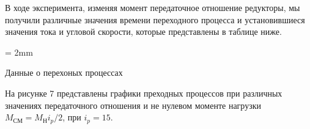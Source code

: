 \documentclass[a4paper, 12pt]{article}
\begin{document}
В ходе эксперимента, изменяя момент передаточное отношение редукторы, мы получили различные значения времени переходного процесса и установившиеся значения тока и угловой скорости, которые представлены в таблице ниже.
\newpage
\begin{table}[h]
	\tabulinesep = 2mm
	\centering
    \begin{threeparttable}
        \caption{Данные о перехоных процессах }
    \end{threeparttable}
\end{table}
\newpage
На рисунке 7 представлены графики преходных процессов при различных значениях передаточного отношения и не нулевом моменте нагрузки $M_\text{СМ} = M_\text{Н}i_p/2$, при $i_p = 15$.
\end{document}
